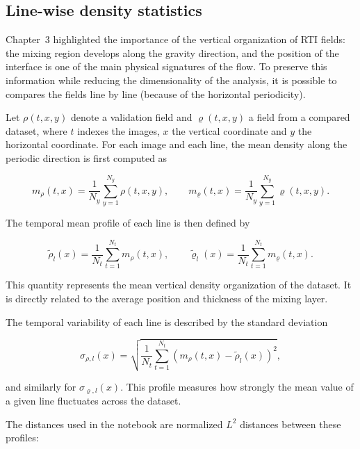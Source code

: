 \subsection{Line-wise density statistics}

Chapter~3 highlighted the importance of the vertical organization of RTI
fields: the mixing region develops along the gravity direction, and the
position of the interface is one of the main physical signatures of the flow.
To preserve this information while reducing the dimensionality of the analysis, 
it is possible to compares the fields line by line (because of the horizontal periodicity).

Let $\rho(t,x,y)$ denote a validation field and $\varrho(t,x,y)$ a field from a
compared dataset, where $t$ indexes the images, $x$ the vertical coordinate and
$y$ the horizontal coordinate. For each image and each line, the mean density
along the periodic direction is first computed as

\begin{equation}
    m_{\rho}(t,x)
    =
    \frac{1}{N_y}
    \sum_{y=1}^{N_y}\rho(t,x,y),
    \qquad
    m_{\varrho}(t,x)
    =
    \frac{1}{N_y}
    \sum_{y=1}^{N_y}\varrho(t,x,y).
\end{equation}

The temporal mean profile of each line is then defined by

\begin{equation}
    \widetilde{\rho}_l(x)
    =
    \frac{1}{N_t}\sum_{t=1}^{N_t}m_{\rho}(t,x),
    \qquad
    \widetilde{\varrho}_l(x)
    =
    \frac{1}{N_t}\sum_{t=1}^{N_t}m_{\varrho}(t,x).
\end{equation}

This quantity represents the mean vertical density organization of the dataset.
It is directly related to the average position and thickness of the mixing
layer.

The temporal variability of each line is described by the standard deviation

\begin{equation}
    \sigma_{\rho,l}(x)
    =
    \sqrt{
        \frac{1}{N_t}
        \sum_{t=1}^{N_t}
        \left(
            m_{\rho}(t,x)-\widetilde{\rho}_l(x)
        \right)^2
    },
\end{equation}

and similarly for $\sigma_{\varrho,l}(x)$. This profile measures how strongly
the mean value of a given line fluctuates across the dataset.

The distances used in the notebook are normalized $L^2$ distances between these
profiles:

